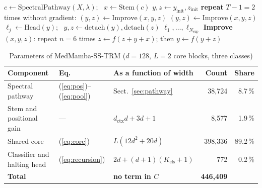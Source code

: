 \documentclass{svproc}
\begin{document}
\begin{algorithm}[H]
\caption{MedMamba-SS-TRM forward pass}\label{alg:forward}
\footnotesize
\begin{algorithmic}[1]
\State $c \gets \mathrm{SpectralPathway}(X, \lambda)$; \ $x \gets \mathrm{Stem}(c)$ 
\State $y, z \gets y_{\text{init}}, z_{\text{init}}$
  \State \textbf{repeat} $T-1 = 2$ times without gradient: $(y, z) \gets \mathrm{Improve}(x, y, z)$
  \State $(y, z) \gets \mathrm{Improve}(x, y, z)$ 
  \State $\ell_j \gets \mathrm{Head}(y)$; \ $y, z \gets \mathrm{detach}(y), \mathrm{detach}(z)$
\EndFor
\State \Return $\ell_1, \ldots, \ell_{N_{\text{sup}}}$ 
\Statex \textbf{Improve}$(x, y, z)$: repeat $n = 6$ times $z \gets f(z + y + x)$; then $y \gets f(y + z)$
\end{algorithmic}
\end{algorithm}

\begin{table}[!htb]
\caption{Parameters of MedMamba-SS-TRM ($d = 128$, $L = 2$ core blocks, three classes)}
\label{tab:params}
\centering\scriptsize
\begin{tabular}{@{}lllrr@{}}
\toprule
Component & Eq. & As a function of width & Count & Share \\
\midrule
Spectral pathway & (\ref{eq:pos})--(\ref{eq:pool}) & Sect.~\ref{sec:pathway} & 38,724 & 8.7\,\% \\
Stem and positional gain & --- & $d_{\text{ctx}} d + 3d + 1$ & 8,577 & 1.9\,\% \\
Shared core & (\ref{eq:core}) & $L(12d^2 + 20d)$ & 398,336 & 89.2\,\% \\
Classifier and halting head & (\ref{eq:recursion}) & $2d + (d+1)(K_{\text{cls}} + 1)$ & 772 & 0.2\,\% \\
\textbf{Total} & & \textbf{no term in $C$} & \textbf{446,409} & \\
\bottomrule
\end{tabular}
\end{table}
\end{document}
